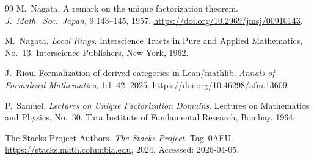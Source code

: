 \documentclass[11pt]{article}
\theoremstyle{plain}
\theoremstyle{definition}
\theoremstyle{remark}
\newcommand{\doi}[1]{\url{https://doi.org/#1}}
\begin{document}
\begin{thebibliography}{99}
M.~Nagata.
\newblock A remark on the unique factorization theorem.
\newblock \emph{J.~Math.\ Soc.\ Japan}, 9:143--145, 1957.
\newblock \doi{10.2969/jmsj/00910143}.

M.~Nagata.
\newblock \emph{Local Rings}.
\newblock Interscience Tracts in Pure and Applied Mathematics, No.~13.
  Interscience Publishers, New York, 1962.

J.~Riou.
\newblock Formalization of derived categories in {L}ean/mathlib.
\newblock \emph{Annals of Formalized Mathematics}, 1:1--42, 2025.
\newblock \doi{10.46298/afm.13609}.

P.~Samuel.
\newblock \emph{Lectures on Unique Factorization Domains}.
\newblock Lectures on Mathematics and Physics, No.~30. Tata Institute of
  Fundamental Research, Bombay, 1964.

The {S}tacks {P}roject Authors.
\newblock \emph{The Stacks Project}, Tag~0AFU.
\newblock \url{https://stacks.math.columbia.edu}, 2024. Accessed:
  2026-04-05.

\end{thebibliography}
\end{document}
